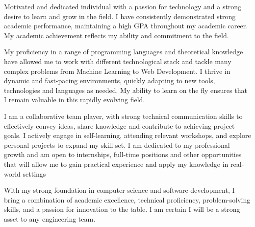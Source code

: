 
\begin{cvparagraph}
	Motivated and dedicated individual with a passion for technology and a 
  strong desire to learn and grow in the field.
	I have consistently demonstrated strong academic performance, 
  maintaining a high GPA throughout my academic career.
	My academic achievement reflects my ability and commitment to the field.

	My proficiency in a range of programming languages and theoretical knowledge
	have allowed me to work with different technological stack and tackle many
	complex problems from Machine Learning to Web Development. I thrive in dynamic
	and fast-pacing environments, quickly adapting to new tools, technologies and
	languages as needed. My ability to learn on the fly ensures that I remain
	valuable in this rapidly evolving field.

	I am a collaborative team player, with strong technical communication skills to
	effectively convey ideas, share knowledge and contribute to achieving project
	goals. I actively engage in self-learning, attending relevant workshops, and
	explore personal projects to expand my skill set. I am dedicated to my
	professional growth and am open to internships, full-time positions and other
	opportunities that will allow me to gain practical experience and apply my
	knowledge in real-world settings

	With my strong foundation in computer science and software development, I bring
	a combination of academic excellence, technical proficiency, problem-solving
	skills, and a passion for innovation to the table. I am certain I will be a
	strong asset to any engineering team.

\end{cvparagraph}
